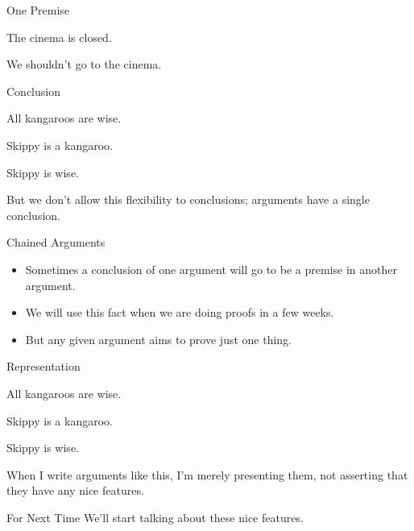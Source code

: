 \documentclass[
  ignorenonframetext,
]{beamer}
\providecommand{\tightlist}{%
  \setlength{\itemsep}{0pt}\setlength{\parskip}{0pt}}
\renewcommand{\,}{\text{, }}
\begin{document}
\begin{frame}{One Premise}
\protect\hypertarget{one-premise}{}
\begin{description}
\tightlist
\item[~]
The cinema is closed.
\item[\(\therefore\)]
We shouldn't go to the cinema.
\end{description}
\end{frame}

\begin{frame}{Conclusion}
\protect\hypertarget{conclusion-1}{}
\begin{description}
\tightlist
\item[~]
All kangaroos are wise.
\item[~]
Skippy is a kangaroo.
\item[\(\therefore\)]
Skippy is wise.
\end{description}

But we don't allow this flexibility to conclusions; arguments have a
single conclusion.
\end{frame}

\begin{frame}{Chained Arguments}
\protect\hypertarget{chained-arguments}{}
\begin{itemize}
\tightlist
\item
  Sometimes a conclusion of one argument will go to be a premise in
  another argument.
\item
  We will use this fact when we are doing proofs in a few weeks.
\item
  But any given argument aims to prove just one thing.
\end{itemize}
\end{frame}

\begin{frame}{Representation}
\protect\hypertarget{representation}{}
\begin{description}
\tightlist
\item[~]
All kangaroos are wise.
\item[~]
Skippy is a kangaroo.
\item[\(\therefore\)]
Skippy is wise.
\end{description}

When I write arguments like this, I'm merely presenting them, not
asserting that they have any nice features.
\end{frame}

\begin{frame}{For Next Time}
\protect\hypertarget{for-next-time}{}
We'll start talking about these nice features.
\end{frame}
\end{document}

